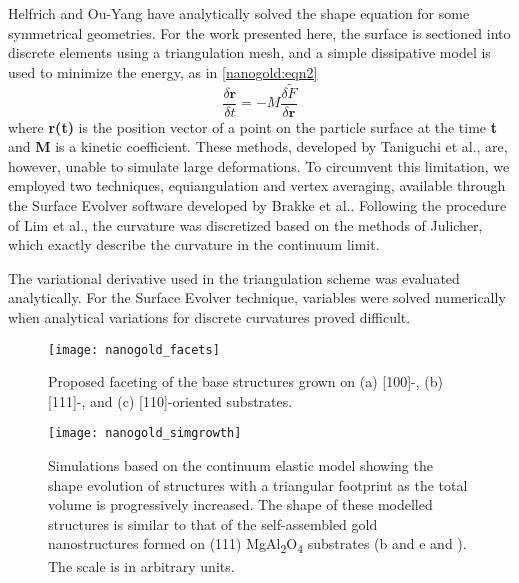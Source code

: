 Helfrich and Ou-Yang\cite{RefWorks:49} have analytically solved the shape equation for some symmetrical geometries.
For the work presented here, the surface is sectioned into discrete elements using a triangulation mesh, and a simple dissipative model is used to minimize the energy, as in \cref{nanogold:eqn2}\cite{RefWorks:76}
\begin{equation}
 \frac{\delta \mathbf{r}}{\delta t} = - M \frac{\delta \tilde{F}}{\delta \mathbf{r}} \label{nanogold:eqn3}
\end{equation}
where \textbf{r(t)} is the position vector of a point on the particle surface at the time \textbf{t} and \textbf{M} is a kinetic coefficient.
These methods, developed by Taniguchi et al.\cite{RefWorks:76}, are, however, unable to simulate large deformations.
To circumvent this limitation, we employed two techniques, equiangulation and vertex averaging, available through the Surface Evolver software developed by Brakke et al.\cite{RefWorks:62}. Following the procedure of Lim et al.,\cite{RefWorks:99,RefWorks:100,RefWorks:101} the curvature was discretized based on the methods of Julicher\cite{RefWorks:52}, which exactly describe the curvature in the continuum limit.

The variational derivative used in the triangulation scheme was evaluated analytically.
For the Surface Evolver technique, variables were solved numerically when analytical variations for discrete curvatures proved difficult.
\begin{figure}
 \centering \texttt{[image: nanogold\_facets]}
 \caption[Model of gold nanostructure faceting]{\label{fig:nanogold_facets}Proposed faceting of the base structures grown on (a) [100]-, (b) [111]-, and (c) [110]-oriented substrates.}
\end{figure}
\begin{figure}
 \centering \texttt{[image: nanogold\_simgrowth]}
 \caption[Simulated gold nanostructure growth]{\label{fig:nanogold_simgrowth}Simulations based on the continuum elastic model showing the shape evolution of structures with a triangular footprint as the total volume is progressively increased.
  The shape of these modelled structures is similar to that of the self-assembled gold nanostructures formed on (111) MgAl\textsubscript{2}O\textsubscript{4} substrates (b and e and ).
  The scale is in arbitrary units.}
\end{figure}

